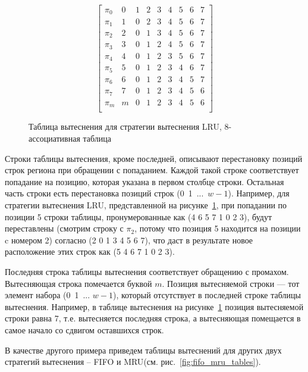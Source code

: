 \documentclass[14pt]{extreport}
\newcommand{\LRU}{\textsf{LRU}\xspace}
\newcommand{\FIFO}{\textsf{FIFO}\xspace}
\newcommand{\MRU}{\textsf{MRU}\xspace}
\begin{document}
\begin{figure}[h]
$$ \left[
     \begin{array}{c|cccccccc}
       \pi_0 & 0 & 1 & 2 & 3 & 4 & 5 & 6 & 7 \\
       \pi_1 & 1 & 0 & 2 & 3 & 4 & 5 & 6 & 7 \\
       \pi_2 & 2 & 0 & 1 & 3 & 4 & 5 & 6 & 7 \\
       \pi_3 & 3 & 0 & 1 & 2 & 4 & 5 & 6 & 7 \\
       \pi_4 & 4 & 0 & 1 & 2 & 3 & 5 & 6 & 7 \\
       \pi_5 & 5 & 0 & 1 & 2 & 3 & 4 & 6 & 7 \\
       \pi_6 & 6 & 0 & 1 & 2 & 3 & 4 & 5 & 7 \\
       \pi_7 & 7 & 0 & 1 & 2 & 3 & 4 & 5 & 6 \\
       \pi_m & m & 0 & 1 & 2 & 3 & 4 & 5 & 6 \\
     \end{array}
   \right]
$$
\caption{Таблица вытеснения для стратегии вытеснения \LRU,
8-ассоциативная таблица}\label{fig:PolicyTableLRU8}
\end{figure}

Строки таблицы вытеснения, кроме последней, описывают перестановку позиций строк региона при обращении с попаданием. Каждой такой строке соответствует попадание на позицию, которая указана в первом столбце строки. Остальная часть строки есть перестановка позиций строк (0~1~...~$w{-}1$). Например, для стратегии вытеснения \LRU,
представленной на рисунке~\ref{fig:PolicyTableLRU8}, при попадании по позиции 5 строки таблицы, пронумерованные как (4 6 5 7 1 0 2 3), будут переставлены (смотрим строку с $\pi_2$, потому что позиция 5 находится на позиции c номером 2) согласно (2 0 1 3 4 5 6 7), что даст в результате новое расположение этих строк как (5 4 6 7 1 0 2 3).

Последняя строка таблицы вытеснения соответствует обращению с промахом. Вытесняющая строка помечается буквой $m$. Позиция вытесняемой строки --- тот элемент набора (0~1~... $w{-}1$), который отсутствует в последней строке таблицы вытеснения. Например, в таблице вытеснения на рисунке~\ref{fig:PolicyTableLRU8} позиция вытесняемой строки равна 7, т.е. вытесняется последняя строка, а вытесняющая помещается в самое начало со сдвигом оставшихся строк.

В качестве другого примера приведем таблицы вытеснений для других двух стратегий вытеснения -- \FIFO и \MRU (см. рис.~\ref{fig:fifo_mru_tables}).
\end{document}
